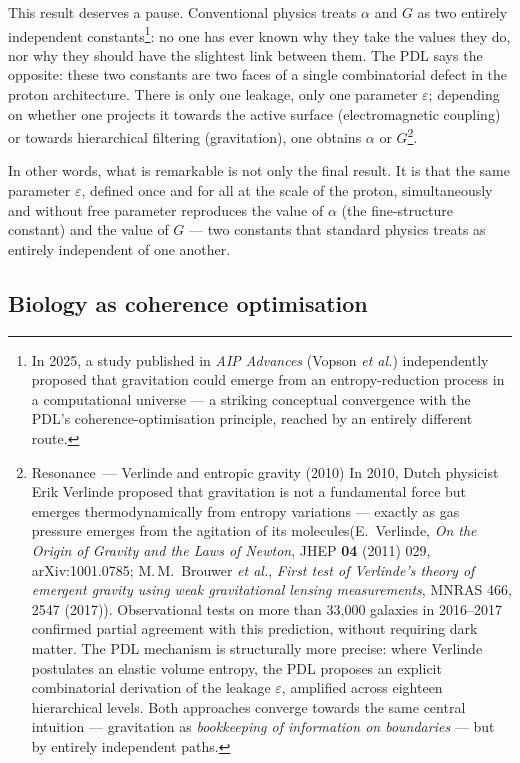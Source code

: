 \documentclass[12pt, a4paper, openright]{book}
\begin{document}
\medskip

This result deserves a pause. Conventional physics treats $\alpha$ and $G$ as two entirely independent constants\footnote{In 2025, a study published in \textit{AIP Advances} (Vopson \textit{et al.}) independently proposed that gravitation could emerge from an entropy-reduction process in a computational universe --- a striking conceptual convergence with the PDL's coherence-optimisation principle, reached by an entirely different route.}: no one has ever known why they take the values they do, nor why they should have the slightest link between them. The PDL says the opposite: these two constants are two faces of a single combinatorial defect in the proton architecture. There is only one leakage, only one parameter $\varepsilon$; depending on whether one projects it towards the active surface (electromagnetic coupling) or towards hierarchical filtering (gravitation), one obtains $\alpha$ or $G$\footnote{Resonance~--- Verlinde and entropic gravity (2010) In 2010, Dutch physicist Erik Verlinde proposed that gravitation is not a fundamental force but emerges thermodynamically from entropy variations --- exactly as gas pressure emerges from the agitation of its molecules(E.\ Verlinde, \textit{On the Origin of Gravity and the Laws of Newton}, JHEP \textbf{04} (2011) 029, arXiv:1001.0785; M.\,M.\ Brouwer \textit{et al.}, \textit{First test of Verlinde's theory of emergent gravity using weak gravitational lensing measurements}, MNRAS 466, 2547 (2017)). Observational tests on more than 33{,}000 galaxies in 2016--2017 confirmed partial agreement with this prediction, without requiring dark matter. The PDL mechanism is structurally more precise: where Verlinde postulates an elastic volume entropy, the PDL proposes an explicit combinatorial derivation of the leakage $\varepsilon$, amplified across eighteen hierarchical levels. Both approaches converge towards the same central intuition --- gravitation as \emph{bookkeeping of information on boundaries} --- but by entirely independent paths.}.

\medskip

In other words, what is remarkable is not only the final result. It is that the same parameter $\varepsilon$, defined once and for all at the scale of the proton, simultaneously and without free parameter reproduces the value of $\alpha$ (the fine-structure constant) and the value of $G$ — two constants that standard physics treats as entirely independent of one another.

\subsection*{Biology as coherence optimisation}
\end{document}
